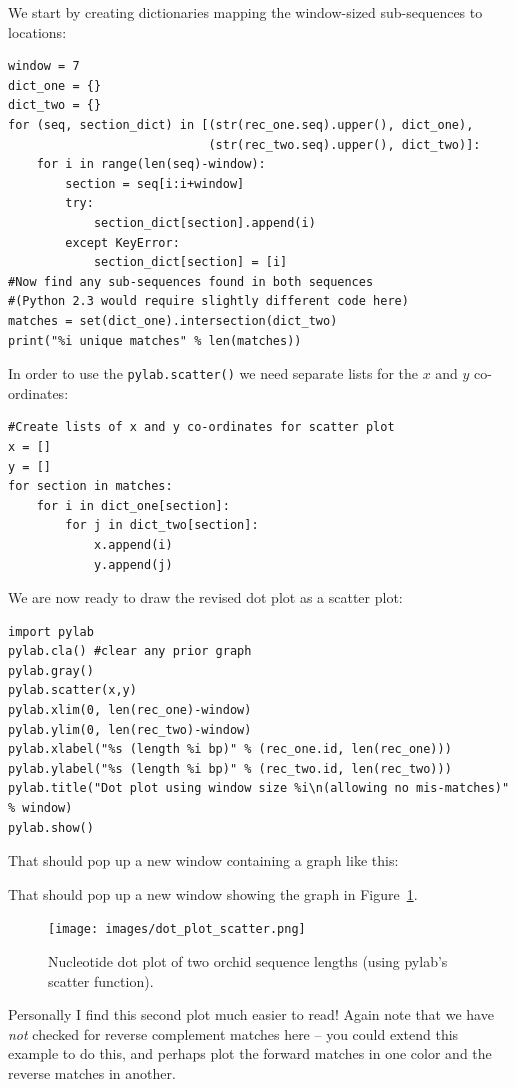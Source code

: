 \documentclass{report}
\begin{document}
We start by creating dictionaries mapping the window-sized sub-sequences to locations:
\begin{verbatim}
window = 7
dict_one = {}
dict_two = {}
for (seq, section_dict) in [(str(rec_one.seq).upper(), dict_one),
                            (str(rec_two.seq).upper(), dict_two)]:
    for i in range(len(seq)-window):
        section = seq[i:i+window]
        try:
            section_dict[section].append(i)
        except KeyError:
            section_dict[section] = [i]
#Now find any sub-sequences found in both sequences
#(Python 2.3 would require slightly different code here)
matches = set(dict_one).intersection(dict_two)
print("%i unique matches" % len(matches))
\end{verbatim}
\noindent In order to use the \verb|pylab.scatter()| we need separate lists for the $x$ and $y$ co-ordinates:
\begin{verbatim}
#Create lists of x and y co-ordinates for scatter plot
x = []
y = []
for section in matches:
    for i in dict_one[section]:
        for j in dict_two[section]:
            x.append(i)
            y.append(j)
\end{verbatim}
\noindent We are now ready to draw the revised dot plot as a scatter plot:
\begin{verbatim}
import pylab
pylab.cla() #clear any prior graph
pylab.gray()
pylab.scatter(x,y)
pylab.xlim(0, len(rec_one)-window)
pylab.ylim(0, len(rec_two)-window)
pylab.xlabel("%s (length %i bp)" % (rec_one.id, len(rec_one)))
pylab.ylabel("%s (length %i bp)" % (rec_two.id, len(rec_two)))
pylab.title("Dot plot using window size %i\n(allowing no mis-matches)" % window)
pylab.show()
\end{verbatim}
%
%
\begin{htmlonly}
\noindent That should pop up a new window containing a graph like this:


\end{htmlonly}
\begin{latexonly}
\noindent That should pop up a new window showing the graph in Figure~\ref{fig:nuc-dot-plot-scatter}.
\begin{figure}[htbp]
\centering
\texttt{[image: images/dot\_plot\_scatter.png]}
\caption{Nucleotide dot plot of two orchid sequence lengths (using pylab's scatter function).}
\label{fig:nuc-dot-plot-scatter}
\end{figure}\end{latexonly}
Personally I find this second plot much easier to read!
Again note that we have \emph{not} checked for reverse complement matches here
-- you could extend this example to do this, and perhaps plot the forward
matches in one color and the reverse matches in another.
\end{document}
